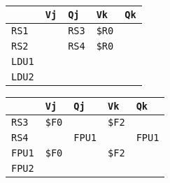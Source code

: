 \begin{enumerate}
    \begin{minipage}{0.45\textwidth}
        \centering
        \begin{tabular}{@{} l | l l l l @{}}
            \toprule
                & \texttt{Vj} & \texttt{Qj} & \texttt{Vk} & \texttt{Qk} \\
            \midrule
            \texttt{RS1} & & \texttt{RS3} & \texttt{\$R0} & \\ [.3em]
            \texttt{RS2} & & \texttt{RS4} & \texttt{\$R0} & \\
            \cmidrule{1-5}
            \texttt{LDU1} & & & & \\ [.3em]
            \texttt{LDU2} & & & & \\
            \bottomrule
        \end{tabular}
    \end{minipage}
    \hfill
    \begin{minipage}{0.45\textwidth}
        \centering
        \begin{tabular}{@{} l | l l l l @{}}
            \toprule
            & \texttt{Vj} & \texttt{Qj} & \texttt{Vk} & \texttt{Qk} \\
            \midrule
            \texttt{RS3} & \texttt{\$F0} & & \texttt{\$F2} & \\ [.3em]
            \texttt{RS4} & & \texttt{FPU1} & & \texttt{FPU1} \\
            \cmidrule{1-5}
            \texttt{FPU1} & \texttt{\$F0} & & \texttt{\$F2} & \\ [.3em]
            \texttt{FPU2} & & & & \\
            \bottomrule
        \end{tabular}
    \end{minipage}


\end{enumerate}
